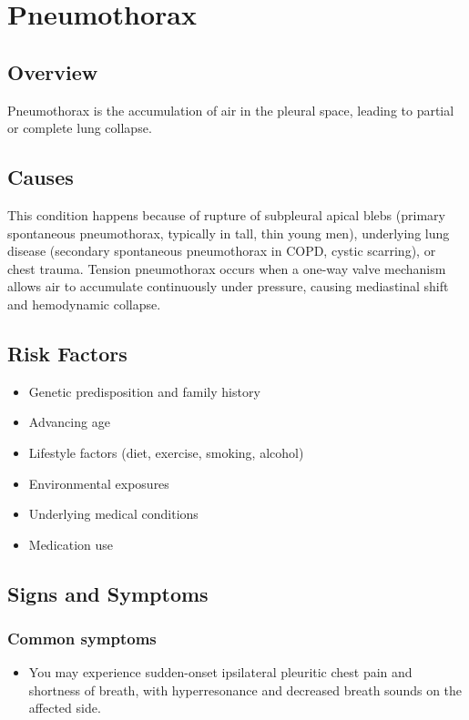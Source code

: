 \chapter{Pneumothorax}
\label{sec:Pneumothorax}

\section{Overview}
Pneumothorax is the accumulation of air in the pleural space, leading to partial or complete lung collapse.
\section{Causes}
This condition happens because of rupture of subpleural apical blebs (primary spontaneous pneumothorax, typically in tall, thin young men), underlying lung disease (secondary spontaneous pneumothorax in COPD, cystic scarring), or chest trauma. Tension pneumothorax occurs when a one-way valve mechanism allows air to accumulate continuously under pressure, causing mediastinal shift and hemodynamic collapse.     
\section{Risk Factors}

\begin{itemize}[noitemsep]
  \item Genetic predisposition and family history
  \item Advancing age
  \item Lifestyle factors (diet, exercise, smoking, alcohol)
  \item Environmental exposures
  \item Underlying medical conditions
  \item Medication use
\end{itemize}
\section{Signs and Symptoms}

\subsection{Common symptoms}
\begin{itemize}[noitemsep]
  \item You may experience sudden-onset ipsilateral pleuritic chest pain and shortness of breath, with hyperresonance and decreased breath sounds on the affected side. 
  \end{itemize}

